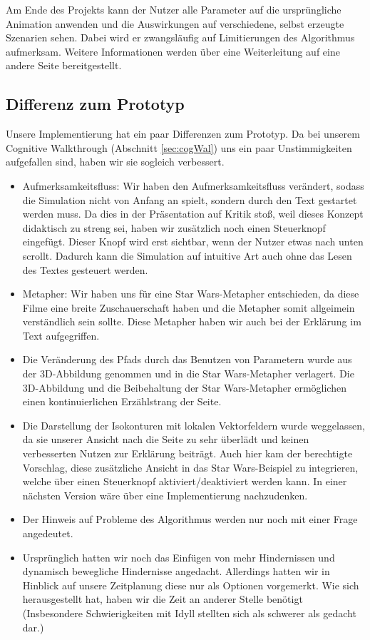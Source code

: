 Am Ende des Projekts kann der Nutzer alle Parameter auf die ursprüngliche Animation anwenden und die Auswirkungen auf verschiedene, selbst erzeugte Szenarien sehen. Dabei wird er zwangsläufig auf Limitierungen des Algorithmus aufmerksam. Weitere Informationen werden über eine Weiterleitung auf eine andere Seite bereitgestellt.


\subsection{Differenz zum Prototyp}
Unsere Implementierung hat ein paar Differenzen zum Prototyp.
Da bei unserem Cognitive Walkthrough (Abschnitt \vref{sec:cogWal}) uns ein paar Unstimmigkeiten aufgefallen sind, haben wir sie sogleich verbessert.
\begin{itemize}
	\item Aufmerksamkeitsfluss: Wir haben den Aufmerksamkeitsfluss verändert, sodass die Simulation nicht von Anfang an spielt, sondern durch den Text gestartet werden muss. Da dies in der Präsentation auf Kritik stoß, weil dieses Konzept didaktisch zu streng sei, haben wir zusätzlich noch einen Steuerknopf eingefügt. Dieser Knopf wird erst sichtbar, wenn der Nutzer etwas nach unten scrollt. Dadurch kann die Simulation auf intuitive Art auch ohne das Lesen des Textes gesteuert werden.
	\item Metapher: Wir haben uns für eine Star Wars-Metapher entschieden, da diese Filme eine breite Zuschauerschaft haben und die Metapher somit allgeimein verständlich sein sollte. Diese Metapher haben wir auch bei der Erklärung im Text aufgegriffen.
	\item Die Veränderung des Pfads durch das Benutzen von Parametern wurde aus der 3D-Abbildung genommen und in die Star Wars-Metapher verlagert. Die 3D-Abbildung und die Beibehaltung der Star Wars-Metapher ermöglichen einen kontinuierlichen Erzählstrang der Seite.
	\item Die Darstellung der Isokonturen mit lokalen Vektorfeldern wurde weggelassen, da sie unserer Ansicht nach die Seite zu sehr überlädt und keinen verbesserten Nutzen zur Erklärung beiträgt. Auch hier kam der berechtigte Vorschlag, diese zusätzliche Ansicht in das Star Wars-Beispiel zu integrieren, welche über einen Steuerknopf aktiviert/deaktiviert werden kann. In einer nächsten Version wäre über eine Implementierung nachzudenken.
	\item Der Hinweis auf Probleme des Algorithmus werden nur noch mit einer Frage angedeutet. 
	\item Ursprünglich hatten wir noch das Einfügen von mehr Hindernissen und dynamisch bewegliche Hindernisse angedacht. Allerdings hatten wir in Hinblick auf unsere Zeitplanung diese nur als Optionen vorgemerkt. Wie sich herausgestellt hat, haben wir die Zeit an anderer Stelle benötigt (Insbesondere Schwierigkeiten mit Idyll stellten sich als schwerer als gedacht dar.)
\end{itemize}

